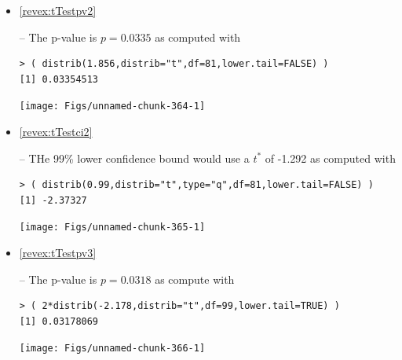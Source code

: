 \documentclass[10pt,openany]{book}\usepackage[]{graphicx}\usepackage[]{color}
\makeatletter
\newenvironment{kframe}{%
 \def\at@end@of@kframe{}%
 \ifinner\ifhmode%
  \def\at@end@of@kframe{\end{minipage}}%
  \begin{minipage}{\columnwidth}%
 \fi\fi%
 \def\FrameCommand##1{\hskip\@totalleftmargin \hskip-\fboxsep
 \colorbox{shadecolor}{##1}\hskip-\fboxsep
     \hskip-\linewidth \hskip-\@totalleftmargin \hskip\columnwidth}%
 \MakeFramed {\advance\hsize-\width
   \@totalleftmargin\z@ \linewidth\hsize
   \@setminipage}}%
 {\par\unskip\endMakeFramed%
 \at@end@of@kframe}
\newenvironment{knitrout}{}{} %
\makeatother
\begin{document}
\begin{itemize}
\begin{knitrout}
{}



\end{knitrout}
  \item \hypertarget{ans:tTestpv2}{\ref{revex:tTestpv2}} -- The p-value is $p=0.0335$ as computed with
\begin{knitrout}
\color{fgcolor}\begin{kframe}
\begin{verbatim}
> ( distrib(1.856,distrib="t",df=81,lower.tail=FALSE) )
[1] 0.03354513
\end{verbatim}
\end{kframe}

{\centering \texttt{[image: Figs/unnamed-chunk-364-1]} 

}



\end{knitrout}
  \item \hypertarget{ans:tTestci2}{\ref{revex:tTestci2}} -- THe 99\% lower confidence bound would use a $t^{*}$ of -1.292 as computed with
\begin{knitrout}
\color{fgcolor}\begin{kframe}
\begin{verbatim}
> ( distrib(0.99,distrib="t",type="q",df=81,lower.tail=FALSE) )
[1] -2.37327
\end{verbatim}
\end{kframe}

{\centering \texttt{[image: Figs/unnamed-chunk-365-1]} 

}



\end{knitrout}
  \item \hypertarget{ans:tTestpv3}{\ref{revex:tTestpv3}} -- The p-value is $p=0.0318$ as compute with
\begin{knitrout}
\color{fgcolor}\begin{kframe}
\begin{verbatim}
> ( 2*distrib(-2.178,distrib="t",df=99,lower.tail=TRUE) )
[1] 0.03178069
\end{verbatim}
\end{kframe}

{\centering \texttt{[image: Figs/unnamed-chunk-366-1]} 

}




\end{knitrout}
\end{itemize}
\end{document}
